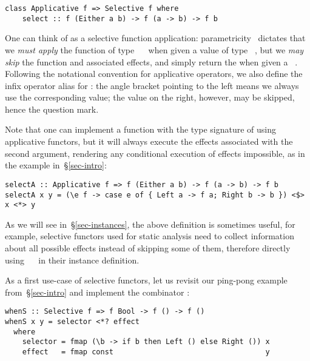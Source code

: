 \vspace{1mm}
\begin{verbatim}
class Applicative f => Selective f where
    select :: f (Either a b) -> f (a -> b) -> f b
\end{verbatim}
\vspace{1mm}

\noindent
One can think of  as a selective function application:
parametricity~\citep{wadler1989theorems} dictates that we \emph{must apply} the
function of type ~\hs{->}~ when given a value of type
~, but we \emph{may skip} the function and associated effects,
and simply return the  when given a ~. Following the
notational convention for applicative operators, we also define the infix
operator alias  for : the angle bracket pointing to the left
means we always use the corresponding value; the value on the right, however,
may be skipped, hence the question mark.

Note that one can implement a function with the type signature of 
using applicative functors, but it will always execute the effects associated
with the second argument, rendering any conditional execution of effects
impossible, as in the  example in~\S\ref{sec-intro}:

\vspace{1mm}
\begin{verbatim}
selectA :: Applicative f => f (Either a b) -> f (a -> b) -> f b
selectA x y = (\e f -> case e of { Left a -> f a; Right b -> b }) <$> x <*> y
\end{verbatim}
\vspace{1mm}

\noindent
As we will see in~\S\ref{sec-instances}, the above definition is sometimes
useful, for example, selective functors used for static analysis need to collect
information about all possible effects instead of skipping some of them,
therefore directly using ~\hs{=}~ in their
 instance definition.

As a first use-case of selective functors, let us revisit our ping-pong example
from~\S\ref{sec-intro} and implement the combinator :

\vspace{1mm}
\begin{verbatim}
whenS :: Selective f => f Bool -> f () -> f ()
whenS x y = selector <*? effect
  where
    selector = fmap (\b -> if b then Left () else Right ()) x
    effect   = fmap const                                   y
\end{verbatim}
\vspace{1mm}

